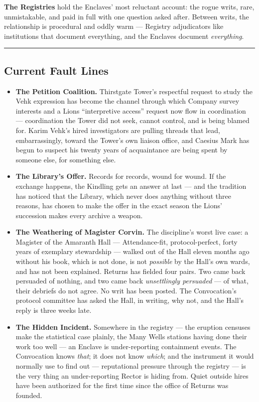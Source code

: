 \textbf{The Registries} hold the Enclaves' most reluctant account: the rogue writs, rare, unmistakable, and paid in full with one question asked after. Between writs, the relationship is procedural and oddly warm --- Registry adjudicators like institutions that document everything, and the Enclaves document \textit{everything}.

\medskip\hrule\medskip

\subsection{Current Fault Lines}

\begin{itemize}
    \item \textbf{The Petition Coalition.} Thirstgate Tower's respectful request to study the Vehk expression has become the channel through which Company survey interests and a Lions ``interpretive access'' request now flow in coordination --- coordination the Tower did not seek, cannot control, and is being blamed for. Karim Vehk's hired investigators are pulling threads that lead, embarrassingly, toward the Tower's own liaison office, and Caesius Mark has begun to suspect his twenty years of acquaintance are being spent by someone else, for something else.
    \item \textbf{The Library's Offer.} Records for records, wound for wound. If the exchange happens, the Kindling gets an answer at last --- and the tradition has noticed that the Library, which never does anything without three reasons, has chosen to make the offer in the exact season the Lions' succession makes every archive a weapon.
    \item \textbf{The Weathering of Magister Corvin.} The discipline's worst live case: a Magister of the Amaranth Hall --- Attendance-fit, protocol-perfect, forty years of exemplary stewardship --- walked out of the Hall eleven months ago without his book, which is not done, is not \textit{possible} by the Hall's own wards, and has not been explained. Returns has fielded four pairs. Two came back persuaded of nothing, and two came back \textit{unsettlingly persuaded} --- of what, their debriefs do not agree. No writ has been posted. The Convocation's protocol committee has asked the Hall, in writing, why not, and the Hall's reply is three weeks late.
    \item \textbf{The Hidden Incident.} Somewhere in the registry --- the eruption censuses make the statistical case plainly, the Many Wells stations having done their work too well --- an Enclave is under-reporting containment events. The Convocation knows \textit{that}; it does not know \textit{which}; and the instrument it would normally use to find out --- reputational pressure through the registry --- is the very thing an under-reporting Rector is hiding from. Quiet outside hires have been authorized for the first time since the office of Returns was founded.

\end{itemize}

